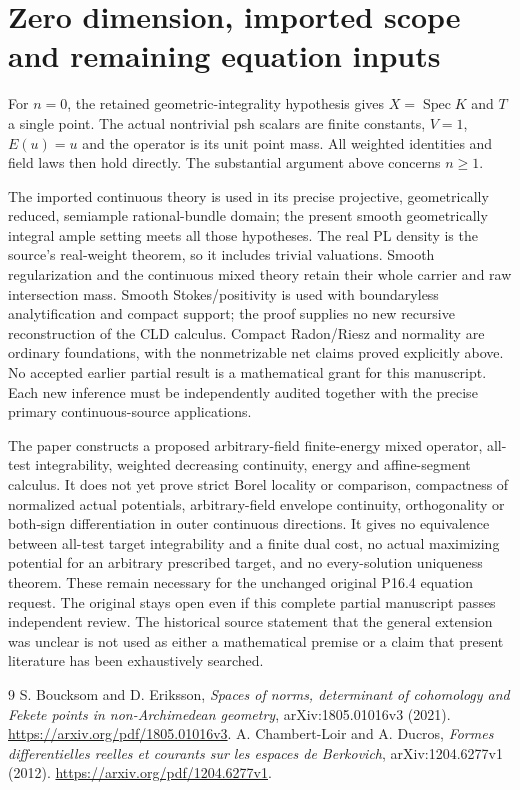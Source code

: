 \documentclass[11pt]{article}
\begin{document}
\section{Zero dimension, imported scope and remaining equation inputs}

For $n=0$, the retained geometric-integrality hypothesis gives
$X=\operatorname{Spec}K$ and $T$ a single point. The actual nontrivial
psh scalars are finite constants, $V=1$, $E(u)=u$ and the operator
is its unit point mass. All weighted identities and field laws then
hold directly. The substantial argument above concerns $n\geq1$.

The imported continuous theory is used in its precise projective,
geometrically reduced, semiample rational-bundle domain; the present
smooth geometrically integral ample setting meets all those
hypotheses. The real PL density is the source's real-weight theorem,
so it includes trivial valuations. Smooth regularization and the
continuous mixed theory retain their whole carrier and raw
intersection mass. Smooth Stokes/positivity is used with boundaryless
analytification and compact support; the proof supplies no new
recursive reconstruction of the CLD calculus. Compact Radon/Riesz
and normality are ordinary foundations, with the nonmetrizable net
claims proved explicitly above. No accepted earlier partial result
is a mathematical grant for this manuscript. Each new inference
must be independently audited together with the precise primary
continuous-source applications.

The paper constructs a proposed arbitrary-field finite-energy mixed
operator, all-test integrability, weighted decreasing continuity,
energy and affine-segment calculus. It does not yet prove strict
Borel locality or comparison, compactness of normalized actual
potentials, arbitrary-field envelope continuity, orthogonality or
both-sign differentiation in outer continuous directions. It gives
no equivalence between all-test target integrability and a finite
dual cost, no actual maximizing potential for an arbitrary prescribed
target, and no every-solution uniqueness theorem. These remain
necessary for the unchanged original P16.4 equation request. The
original stays open even if this complete partial manuscript passes
independent review. The historical source statement that the general
extension was unclear is not used as either a mathematical premise
or a claim that present literature has been exhaustively searched.

\begin{thebibliography}{9}
S. Boucksom and D. Eriksson,
\emph{Spaces of norms, determinant of cohomology and Fekete points
in non-Archimedean geometry}, arXiv:1805.01016v3 (2021).
\url{https://arxiv.org/pdf/1805.01016v3}.
A. Chambert-Loir and A. Ducros,
\emph{Formes differentielles reelles et courants sur les espaces de
Berkovich}, arXiv:1204.6277v1 (2012).
\url{https://arxiv.org/pdf/1204.6277v1}.
\end{thebibliography}
\end{document}
